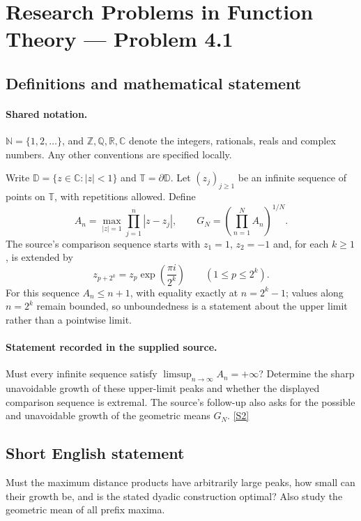 \documentclass[11pt]{book}
\newcommand{\sref}[2]{\hyperlink{source:#1:#2}{[S#2]}}
\begin{document}
\section{Research Problems in Function Theory — Problem 4.1}\label{statement}

\subsection{Definitions and mathematical statement}

\paragraph{Shared notation.}$\mathbb N=\{1,2,\ldots\}$, and $\mathbb Z,\mathbb Q,\mathbb R,\mathbb C$ denote the integers, rationals, reals and complex numbers. Any other conventions are specified locally.


Write $\mathbb D=\{z\in\mathbb C:|z|<1\}$ and $\mathbb T=\partial\mathbb D$. Let $(z_j)_{j\ge1}$ be an infinite sequence of points on $\mathbb T$, with repetitions allowed. Define
\[A_n=\max_{|z|=1}\prod_{j=1}^n|z-z_j|,\qquad G_N=\left(\prod_{n=1}^NA_n\right)^{1/N}.
\]
The source's comparison sequence starts with $z_1=1$, $z_2=-1$ and, for each $k\ge1$, is extended by
\[z_{p+2^k}=z_p\exp\!\left(\frac{\pi i}{2^k}\right)\qquad(1\le p\le2^k).
\]
For this sequence $A_n\le n+1$, with equality exactly at $n=2^k-1$; values along $n=2^k$ remain bounded, so unboundedness is a statement about the upper limit rather than a pointwise limit.
\paragraph{Statement recorded in the supplied source.}
Must every infinite sequence satisfy $\limsup_{n\to\infty}A_n=+\infty$? Determine the sharp unavoidable growth of these upper-limit peaks and whether the displayed comparison sequence is extremal. The source's follow-up also asks for the possible and unavoidable growth of the geometric means $G_N$. \sref{statement}{2}
\subsection{Short English statement}
Must the maximum distance products have arbitrarily large peaks, how small can their growth be, and is the stated dyadic construction optimal? Also study the geometric mean of all prefix maxima.
\end{document}
